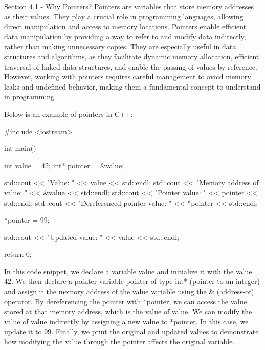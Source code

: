 \begin{notes}{Section 4.1 - Why Pointers?}
    Pointers are variables that store memory addresses as their values. They play a crucial role in programming languages, allowing direct manipulation and access to memory locations. Pointers enable efficient data manipulation 
    by providing a way to refer to and modify data indirectly, rather than making unnecessary copies. They are especially useful in data structures and algorithms, as they facilitate dynamic memory allocation, efficient traversal 
    of linked data structures, and enable the passing of values by reference. However, working with pointers requires careful management to avoid memory leaks and undefined behavior, making them a fundamental concept to understand 
    in programming
    
    \begin{highlight}
        Below is an example of pointers in C++:
    \begin{code}[C++]
    #include <iostream>

    int main() {
        int value = 42;
        int* pointer = &value;
    
        std::cout << "Value: " << value << std::endl;
        std::cout << "Memory address of value: " << &value << std::endl;
        std::cout << "Pointer value: " << pointer << std::endl;
        std::cout << "Dereferenced pointer value: " << *pointer << std::endl;
    
        *pointer = 99;
    
        std::cout << "Updated value: " << value << std::endl;
    
        return 0;
    }
    \end{code}
        In this code snippet, we declare a variable value and initialize it with the value 42. We then declare a pointer variable pointer of type int* (pointer to an integer) and assign it the memory address of the value variable using 
        the \& (address-of) operator. By dereferencing the pointer with *pointer, we can access the value stored at that memory address, which is the value of value. We can modify the value of value indirectly by assigning a new value 
        to *pointer. In this case, we update it to 99. Finally, we print the original and updated values to demonstrate how modifying the value through the pointer affects the original variable.
    \end{highlight}
\end{notes}

